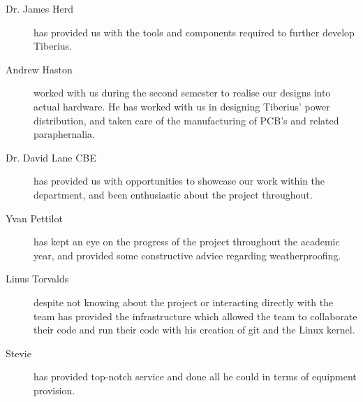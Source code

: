 \begin{description}
\item [Dr. James Herd] has provided us with the tools and components required to further develop Tiberius.

\item [Andrew Haston] worked with us during the second semester to realise our designs into actual hardware. He has worked with us in designing Tiberius' power distribution, and taken care of the manufacturing of PCB's and related paraphernalia.

\item [Dr. David Lane CBE] has provided us with opportunities to showcase our work within the department, and been enthusiastic about the project throughout.

\item [Yvan Pettilot] has kept an eye on the progress of the project throughout the academic year, and provided some constructive advice regarding weatherproofing.

\item [Linus Torvalds] despite not knowing about the project or interacting directly with the team has provided the infrastructure which allowed the team to collaborate their code and run their code with his creation of git and the Linux kernel.

\item [Stevie] has provided top-notch service and done all he could in terms of equipment provision.

\end{description}
